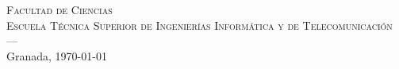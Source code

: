 \begin{titlepage}
\begin{minipage}{\textwidth}
\centering
\vspace{0.5cm}
\textsc{Facultad de Ciencias \\ Escuela Técnica Superior de Ingenierías Informática y de Telecomunicación}\\
\textsc{---}\\
Granada, \today
\end{minipage}
\end{titlepage}


